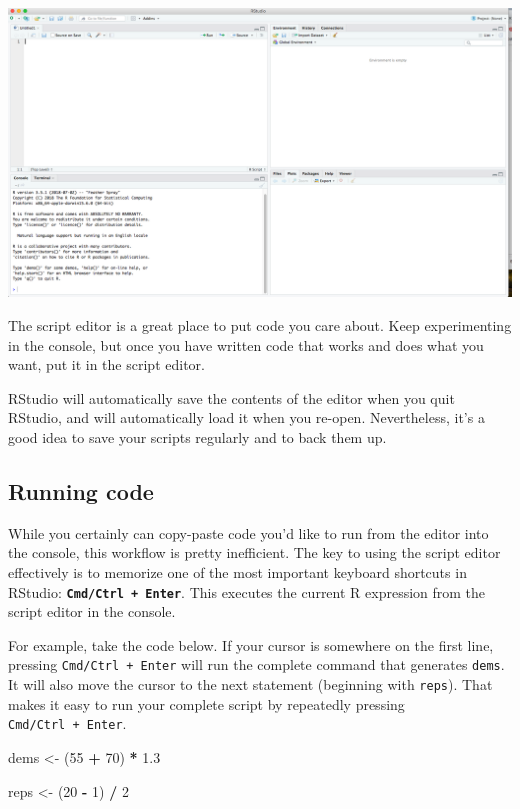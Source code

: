\documentclass[]{book}
\newenvironment{Shaded}{\begin{snugshade}}{\end{snugshade}}
\newcommand{\DecValTok}[1]{\textcolor[rgb]{0.00,0.00,0.81}{#1}}
\newcommand{\FloatTok}[1]{\textcolor[rgb]{0.00,0.00,0.81}{#1}}
\newcommand{\StringTok}[1]{\textcolor[rgb]{0.31,0.60,0.02}{#1}}
\newcommand{\OperatorTok}[1]{\textcolor[rgb]{0.81,0.36,0.00}{\textbf{#1}}}
\newcommand{\NormalTok}[1]{#1}
\begin{document}
\begin{center}\includegraphics[width=0.7\linewidth]{img/4-panes} \end{center}

The script editor is a great place to put code you care about. Keep
experimenting in the console, but once you have written code that works
and does what you want, put it in the script editor.

RStudio will automatically save the contents of the editor when you quit
RStudio, and will automatically load it when you re-open. Nevertheless,
it's a good idea to save your scripts regularly and to back them up.

\subsection{Running code}\label{running-code}

While you certainly can copy-paste code you'd like to run from the
editor into the console, this workflow is pretty inefficient. The key to
using the script editor effectively is to memorize one of the most
important keyboard shortcuts in RStudio:
\textbf{\texttt{Cmd/Ctrl\ +\ Enter}}. This executes the current R
expression from the script editor in the console.

For example, take the code below. If your cursor is somewhere on the
first line, pressing \texttt{Cmd/Ctrl\ +\ Enter} will run the complete
command that generates \texttt{dems}. It will also move the cursor to
the next statement (beginning with \texttt{reps}). That makes it easy to
run your complete script by repeatedly pressing
\texttt{Cmd/Ctrl\ +\ Enter}.

\begin{Shaded}
\begin{Highlighting}[]
\NormalTok{dems <-}\StringTok{ }\NormalTok{(}\DecValTok{55} \OperatorTok{+}\StringTok{ }\DecValTok{70}\NormalTok{) }\OperatorTok{*}\StringTok{ }\FloatTok{1.3}

\NormalTok{reps <-}\StringTok{ }\NormalTok{(}\DecValTok{20} \OperatorTok{-}\StringTok{ }\DecValTok{1}\NormalTok{) }\OperatorTok{/}\StringTok{ }\DecValTok{2}
\end{Highlighting}
\end{Shaded}
\end{document}
